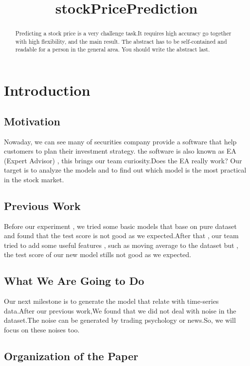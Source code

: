 \documentclass{article}
\title{stockPricePrediction}
\begin{document}
%
\maketitle
%
\begin{abstract}
Predicting a stock price is a very challenge task.It requires high accuracy go together with high flexibility, and the main result.  The abstract has to be
self-contained and readable for a person in the general area. You
should write the abstract last.
\end{abstract}

\section{Introduction}\label{sec:intro}

\subsection{Motivation}

Nowaday, we can see many of securities company provide a software that help customers to plan their investment strategy.
the software is also known as EA (Expert Advisor) , this brings our team curiosity.Does the EA really work? Our target is to analyze the models and to find out which model is the most practical in the stock market.

\subsection{Previous Work}

Before our experiment , we tried some basic models that base on pure dataset and found that the test score is not good as we expected.After that , our team tried to add some useful features , such as moving average to the dataset but , the test score of our new model stills not good as we expected.

\subsection{What We Are Going to Do}

Our next milestone is to generate the model that relate with time-series data.After our previous work,We found that we did not deal with noise in the dataset.The noise can be generated by trading psychology or news.So, we will focus on these noises too.

\subsection{Organization of the Paper}
\end{document}
